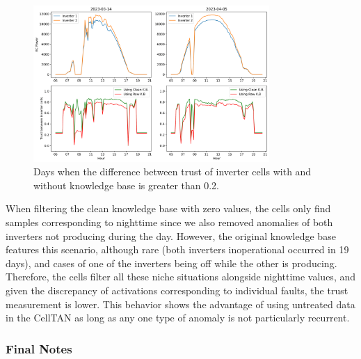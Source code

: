 \begin{figure}[h!]
    \centering
    \includegraphics[width=0.8\textwidth]{figures/chapter5/results/real/trust_dirty_interesting_days-1.png}
    \caption{Days when the difference between trust of inverter cells with and without knowledge base is greater than 0.2.}
    \label{fig:dirty_interesting}
\end{figure}

When filtering the clean knowledge base with zero values, the cells only find samples corresponding to nighttime since we also removed anomalies of both inverters not producing during the day. However, the original knowledge base features this scenario, although rare (both inverters inoperational occurred in 19 days), and cases of one of the inverters being off while the other is producing. Therefore, the cells filter all these niche situations alongside nighttime values, and given the discrepancy of activations corresponding to individual faults, the trust measurement is lower. This behavior shows the advantage of using untreated data in the CellTAN as long as any one type of anomaly is not particularly recurrent.

\subsubsection{Final Notes}






